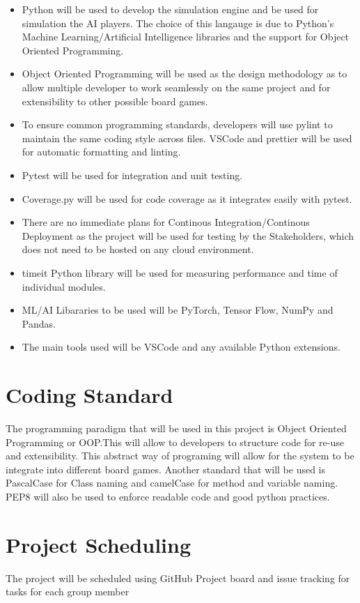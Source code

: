 \documentclass{article}
\begin{document}
\begin{itemize}
\item Python will be used to develop the simulation engine and be used for simulation the AI players. 
The choice of this langauge is due to Python's Machine Learning/Artificial Intelligence libraries and the support for
 Object Oriented Programming.
\item Object Oriented Programming will be used as the design methodology as to allow multiple developer to work seamlessly 
on the same project and for extensibility to other possible board games. 
\item To ensure common programming standards, developers will use pylint to maintain the same coding style across files. 
VSCode and prettier will be used for automatic formatting and linting.
\item Pytest will be used for integration and unit testing.
\item Coverage.py will be used for code coverage as it integrates easily with pytest.
\item There are no immediate plans for Continous Integration/Continous Deployment as the project will be used for testing by the 
Stakeholders, which does not need to be hosted on any cloud environment.
\item timeit Python library will be used for measuring performance and time of individual modules.
\item ML/AI Libararies to be used will be PyTorch, Tensor Flow, NumPy and Pandas.
\item The main tools used will be VSCode and any available Python extensions.
\end{itemize}

\section{Coding Standard}
The programming paradigm that will be used in this project is Object Oriented Programming or OOP.This will allow to developers to structure code
for re-use and extensibility. This abstract way of programing will allow for the system to be integrate into different board games. Another standard that
will be used is PascalCase for Class naming and camelCase for method and variable naming. PEP8 will also be used to enforce readable code and good python practices.

\section{Project Scheduling}
The project will be scheduled using GitHub Project board and issue tracking for tasks for each group member
\end{document}
